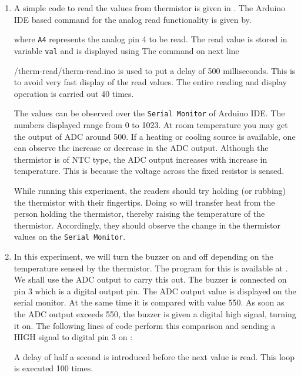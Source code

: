 \begin{enumerate}
  \item A simple code to read the values from thermistor is given in
        . The Arduino IDE based command for the analog read functionality is given by.
        
        where {\tt A4} represents the analog pin 4 to be read.
        The read value is stored in variable {\tt val} and is
        displayed using 
        The command on next line

          {\LocTHERMardcode/therm-read/therm-read.ino}
        is used to put a delay of 500 milliseconds. This is to avoid very fast display of the read values. The entire reading and display operation is carried out 40 times.

        The values can be observed over the {\tt Serial Monitor} of Arduino IDE.
        The numbers displayed range from 0 to 1023. At room temperature you may get the
        output of ADC around 500. If a heating or cooling source is available,
        one can observe the increase or decrease in the ADC output. Although
        the thermistor is of NTC type, the ADC output increases with increase
        in temperature. This is because the voltage across the fixed resistor
        is sensed.

        While running this experiment,
        the readers should try holding (or rubbing) the thermistor with their fingertips.
        Doing so will transfer heat from the person holding the
        thermistor, thereby raising the temperature of the thermistor. Accordingly, they should observe the change in the thermistor values
        on the {\tt Serial Monitor}.

  \item In this experiment, we will turn the buzzer on and off depending
        on the temperature sensed by the thermistor. The program for this is
        available at . We shall use the ADC output
        to carry this out. The buzzer is connected on pin 3 which is a
        digital output pin. The ADC output value is displayed on the serial
        monitor. At the same time it is compared with value 550. As
        soon as the ADC output exceeds 550, the buzzer is given a digital
        high signal, turning it on. The following lines of code perform this
        comparison and sending a {HIGH} signal to digital pin 3 on \arduino:
        
        A delay of half a second is introduced
        before the next value is read. This loop is executed 100 times.


\end{enumerate}
